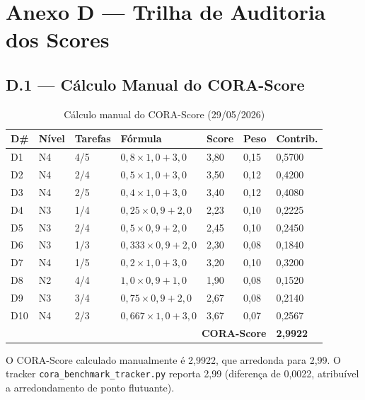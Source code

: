 \documentclass[12pt,a4paper,oneside]{article}
\begin{document}
\newpage

\section{Anexo D — Trilha de Auditoria dos Scores}

\subsection{D.1 — Cálculo Manual do CORA-Score}

\begin{table}[H]
\centering
\caption{Cálculo manual do CORA-Score (29/05/2026)}
\label{tab:audit}
\begin{tabular}{p{}p{}p{}p{}p{}p{}p{}}
\toprule
\textbf{D\#} & \textbf{Nível} & \textbf{Tarefas} & \textbf{Fórmula} & \textbf{Score} & \textbf{Peso} & \textbf{Contrib.} \\
\midrule
D1 & N4 & 4/5 & $0{,}8\times1{,}0+3{,}0$ & 3,80 & 0,15 & 0,5700 \\
D2 & N4 & 2/4 & $0{,}5\times1{,}0+3{,}0$ & 3,50 & 0,12 & 0,4200 \\
D3 & N4 & 2/5 & $0{,}4\times1{,}0+3{,}0$ & 3,40 & 0,12 & 0,4080 \\
D4 & N3 & 1/4 & $0{,}25\times0{,}9+2{,}0$ & 2,23 & 0,10 & 0,2225 \\
D5 & N3 & 2/4 & $0{,}5\times0{,}9+2{,}0$ & 2,45 & 0,10 & 0,2450 \\
D6 & N3 & 1/3 & $0{,}333\times0{,}9+2{,}0$ & 2,30 & 0,08 & 0,1840 \\
D7 & N4 & 1/5 & $0{,}2\times1{,}0+3{,}0$ & 3,20 & 0,10 & 0,3200 \\
D8 & N2 & 4/4 & $1{,}0\times0{,}9+1{,}0$ & 1,90 & 0,08 & 0,1520 \\
D9 & N3 & 3/4 & $0{,}75\times0{,}9+2{,}0$ & 2,67 & 0,08 & 0,2140 \\
D10 & N4 & 2/3 & $0{,}667\times1{,}0+3{,}0$ & 3,67 & 0,07 & 0,2567 \\
\midrule
\multicolumn{6}{r}{\textbf{CORA-Score}} & \textbf{2,9922} \\
\bottomrule
\end{tabular}
\end{table}

O CORA-Score calculado manualmente é 2,9922, que arredonda para 2,99. O tracker
\texttt{cora\_benchmark\_tracker.py} reporta 2,99 (diferença de 0,0022,
atribuível a arredondamento de ponto flutuante).
\end{document}

